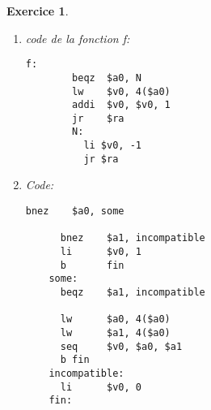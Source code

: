 \documentclass{article}
\theoremstyle{plain}
\newtheorem{exo}{Exercice}%
\begin{document}
\begin{exo}
\begin{enumerate}
  \item code de la fonction f:
    \begin{lstlisting}[texcl=false, mathescape=false]
      f:
        beqz  $a0, N
        lw    $v0, 4($a0)
        addi  $v0, $v0, 1
        jr    $ra
        N:
          li $v0, -1
          jr $ra
    \end{lstlisting}

  \newpage
  \item Code:
    \begin{lstlisting}[texcl=fasle, mathescape=false]
      bnez    $a0, some
      
      bnez    $a1, incompatible
      li      $v0, 1
      b       fin
    some:
      beqz    $a1, incompatible

      lw      $a0, 4($a0)
      lw      $a1, 4($a0)
      seq     $v0, $a0, $a1
      b fin
    incompatible:
      li      $v0, 0
    fin:
    \end{lstlisting}
\end{enumerate}
\end{exo}
\end{document}
